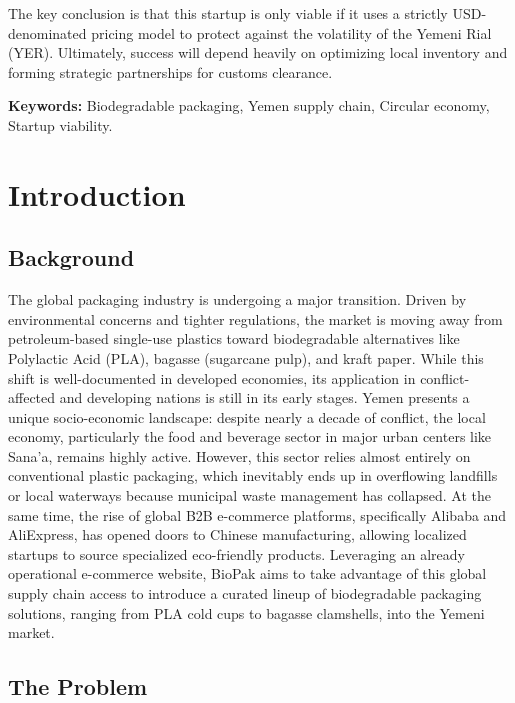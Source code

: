\documentclass[12pt,a4paper]{article}
\begin{document}
The key conclusion is that this startup is only viable if it uses a strictly USD-denominated pricing model to protect against the volatility of the Yemeni Rial (YER). Ultimately, success will depend heavily on optimizing local inventory and forming strategic partnerships for customs clearance.

\textbf{Keywords:} Biodegradable packaging, Yemen supply chain, Circular economy, Startup viability.

\section{Introduction}

\subsection{Background}

The global packaging industry is undergoing a major transition. Driven by environmental concerns and tighter regulations, the market is moving away from petroleum-based single-use plastics toward biodegradable alternatives like Polylactic Acid (PLA), bagasse (sugarcane pulp), and kraft paper. While this shift is well-documented in developed economies, its application in conflict-affected and developing nations is still in its early stages. Yemen presents a unique socio-economic landscape: despite nearly a decade of conflict, the local economy, particularly the food and beverage sector in major urban centers like Sana'a, remains highly active. However, this sector relies almost entirely on conventional plastic packaging, which inevitably ends up in overflowing landfills or local waterways because municipal waste management has collapsed. At the same time, the rise of global B2B e-commerce platforms, specifically Alibaba and AliExpress, has opened doors to Chinese manufacturing, allowing localized startups to source specialized eco-friendly products. Leveraging an already operational e-commerce website, BioPak aims to take advantage of this global supply chain access to introduce a curated lineup of biodegradable packaging solutions, ranging from PLA cold cups to bagasse clamshells, into the Yemeni market.

\subsection{The Problem}
\end{document}
